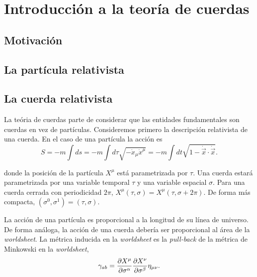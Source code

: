 \chapter{Introducción a la teoría de cuerdas}


\section{Motivación}


\section{La partícula relativista}


\section{La cuerda relativista}


La teória de cuerdas parte de considerar que las entidades fundamentales son cuerdas
en vez de partículas. 
Consideremos primero la descripción relativista de una cuerda. En el caso de una
partícula la acción es
\begin{equation}
  S=-m\int ds = -m\int d\tau \sqrt{-\dot{x}_\mu\dot{x}^\mu}=-m\int dt \sqrt{1-\dot {\vec{x}} \cdot \dot {\vec{x}}}.
\end{equation}

donde la posición de la partícula $X^\mu$ está parametrizada por $\tau$.
Una cuerda estará parametrizada por una variable temporal $\tau$ y una variable espacial $\sigma$.
Para una cuerda cerrada con periodicidad $2\pi$, $X^\mu(\tau,\sigma)=X^\mu(\tau,\sigma+2\pi)$.
De forma más compacta, $(\sigma^0,\sigma^1)=(\tau,\sigma)$.

La acción de una partícula es proporcional a la longitud de su línea de universo.
De forma análoga, la acción de una cuerda debería ser proporcional al área de la
\emph{worldsheet}. 
La métrica inducida en la \emph{worldsheet} es la \emph{pull-back} de la métrica de Minkowski
en la \emph{worldsheet},
\begin{equation}
  \gamma_{ab}=\pdv{X^\mu}{\sigma^\alpha}\pdv{X^\nu}{\sigma^\beta}\eta_{\mu\nu}.
\end{equation}

